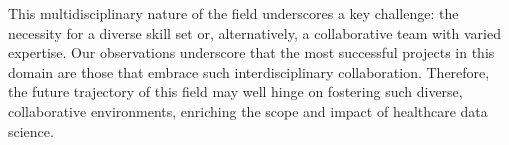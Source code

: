 This multidisciplinary nature of the field underscores a key challenge: the necessity for a diverse skill set or, alternatively, a collaborative team with varied expertise. Our observations underscore that the most successful projects in this domain are those that embrace such interdisciplinary collaboration. Therefore, the future trajectory of this field may well hinge on fostering such diverse, collaborative environments, enriching the scope and impact of healthcare data science.

